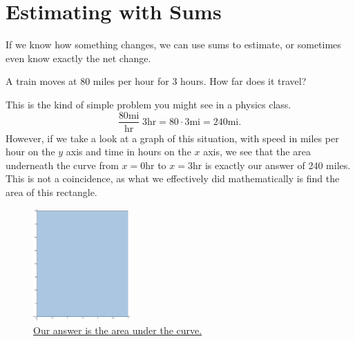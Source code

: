 \section{Estimating with Sums}
If we know how something changes, we can use sums to estimate, or sometimes even know exactly the net change.

\begin{example}
	A train moves at 80 miles per hour for 3 hours.
	How far does it travel?
\end{example}
\begin{answer}
	This is the kind of simple problem you might see in a physics class.
	\begin{equation*}
		\frac{80\text{mi}}{\text{hr}} \hspace{3pt} 3\text{hr} = 80\cdot 3\text{mi} = 240 \text{mi}.
	\end{equation*}
	However, if we take a look at a graph of this situation, with speed in miles per hour on the $y$ axis and time in hours on the $x$ axis, we see that the area underneath the curve from $x=0\text{hr}$ to $x=3\text{hr}$ is exactly our answer of 240 miles.
	This is not a coincidence, as what we effectively did mathematically is find the area of this rectangle.
	
	\begin{figure}[H]
		\label{constant_graph}
		\centering
		\includegraphics[width = 0.33\textwidth]{./integrals/constant_graph.png}
		\caption{\hyperref{}{}{}{Our answer is the area under the curve.}}
	\end{figure}
	\end{answer}

